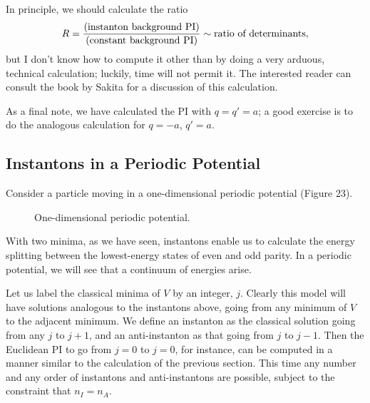 \documentclass[12pt]{article}
\begin{document}
In principle, we should calculate the ratio
\[
R={(\mbox{instanton background PI})\over
(\mbox{constant background PI})}\sim
\mbox{ratio of determinants},
\]
but I don't know how to compute it other than by doing
a very arduous, technical calculation; luckily, time will not permit
it. The interested reader can consult the book by Sakita for a
discussion of this calculation.

As a final note, we have calculated the PI with $q=q'=a$; a good
exercise is to do the analogous calculation for $q=-a$, $q'=a$.

\subsection{Instantons in a Periodic Potential}

Consider a particle moving in a one-dimensional periodic potential
(Figure 23).
\begin{figure}[hb]
\epsfysize=4cm
\centerline{}
\caption{One-dimensional periodic potential.}
\end{figure}


With two minima, as we have seen,
instantons enable us to calculate the energy splitting between the
lowest-energy states of even and odd parity. In a periodic
potential, we
will see that a continuum of energies arise. 

Let us label the
classical minima of $V$ by an integer, $j$. 
Clearly this model will have solutions analogous to the instantons
above, going from any minimum of $V$ to the adjacent minimum.
We define an instanton as the classical
solution going from any $j$ to $j+1$, and an anti-instanton as that
going from $j$ to $j-1$. 
Then the Euclidean PI to go from
$j=0$ to $j=0$, for
instance, can be computed in a manner similar to the calculation
of the previous section. This time any number and any order of
instantons and anti-instantons are possible, subject to the constraint
that $n_I=n_A$.
\end{document}
